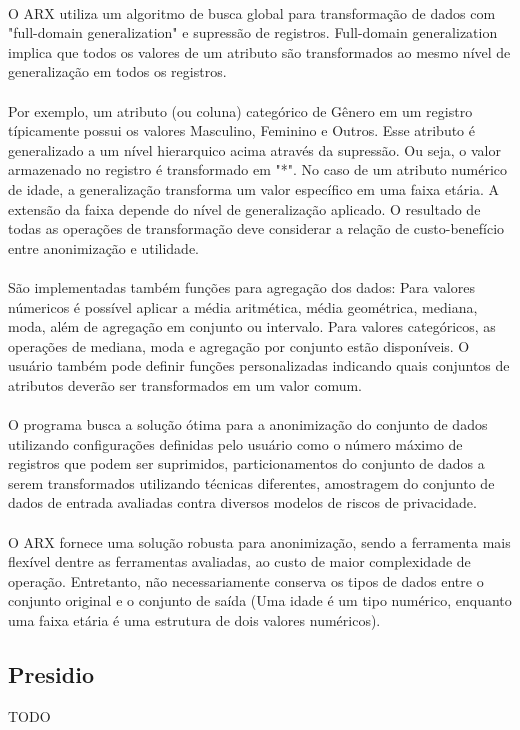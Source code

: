 \paragraph{} O ARX utiliza um algoritmo de busca global para transformação de dados com "full-domain generalization" e supressão de registros. Full-domain generalization implica que todos os  valores de um atributo são transformados ao mesmo nível de generalização em todos os registros.

\paragraph{} Por exemplo, um atributo (ou coluna) categórico de Gênero em um registro típicamente possui os valores Masculino, Feminino e Outros. Esse atributo é generalizado a um nível hierarquico acima através da supressão. Ou seja, o valor armazenado no registro é transformado em "*". No caso de um atributo numérico de idade, a generalização transforma um valor específico em uma faixa etária. A extensão da faixa depende do nível de generalização aplicado. O resultado de todas as operações de transformação deve considerar a relação de custo-benefício entre anonimização e utilidade.

\paragraph{} São implementadas também funções para agregação dos dados: Para valores númericos é possível aplicar a média aritmética, média geométrica, mediana, moda, além de agregação em conjunto ou intervalo. Para valores categóricos, as operações de mediana, moda e agregação por conjunto estão disponíveis. O usuário também pode definir funções personalizadas indicando quais conjuntos de atributos deverão ser transformados em um valor comum.

\paragraph{} O programa busca a solução ótima para a anonimização do conjunto de dados utilizando configurações definidas pelo usuário como o número máximo de registros que podem ser suprimidos, particionamentos do conjunto de dados a serem transformados utilizando técnicas diferentes, amostragem do conjunto de dados de entrada avaliadas contra diversos modelos de riscos de privacidade.

\paragraph{} O ARX fornece uma solução robusta para anonimização, sendo a ferramenta mais flexível dentre as ferramentas avaliadas, ao custo de maior complexidade de operação. Entretanto, não necessariamente conserva os tipos de dados entre o conjunto original e o conjunto de saída (Uma idade é um tipo numérico, enquanto uma faixa etária é uma estrutura de dois valores numéricos).

\subsection{Presidio}

\cite{presidio}

TODO
